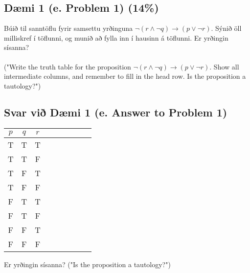 \subsection*{Dæmi 1 (e. Problem 1) (14\%)\label{section:problem1}}
Búið til sanntöflu fyrir samsettu yrðinguna $\neg(r\land \neg q) \to(p\lor \neg r)$. Sýnið öll milliskref í töflunni, og munið að fylla inn í hausinn á töflunni. Er yrðingin sísanna? \\ \\
("Write the truth table for the proposition $\neg(r\land \neg q) \to(p\lor \neg r)$. Show all intermediate columns, and remember to fill in the head row. Is the proposition a tautology?")

\subsection*{Svar við Dæmi 1 (e. Answer to Problem 1)}

\begin{center}
    \begin{tabular}{ |c|c|c|p{0.8 cm}|p{0.8 cm}|p{1.8 cm}|p{2 cm}|p{2 cm}|p{3.8 cm}|} 
        \hline
        $p$ & $q$ & $r$ & & & & & & \\
        \hline
        T & T & T &  &  &  &  &  & \\ 
        \hline
        T & T & F &  &  &  &  &  & \\ 
        \hline
        T & F & T &  &  &  &  &  & \\ 
        \hline
        T & F & F &  &  &  &  &  & \\ 
        \hline
        F & T & T &  &  &  &  &  & \\
        \hline
        F & T & F &  &  &  &  &  & \\ 
        \hline
        F & F & T &  &  &  &  &  & \\ 
        \hline
        F & F & F &  &  &  &  &  & \\
        \hline
    \end{tabular}
\end{center}
Er yrðingin sísanna? ("Is the proposition a tautology?")
\fillin[5cm]{
  
    }     